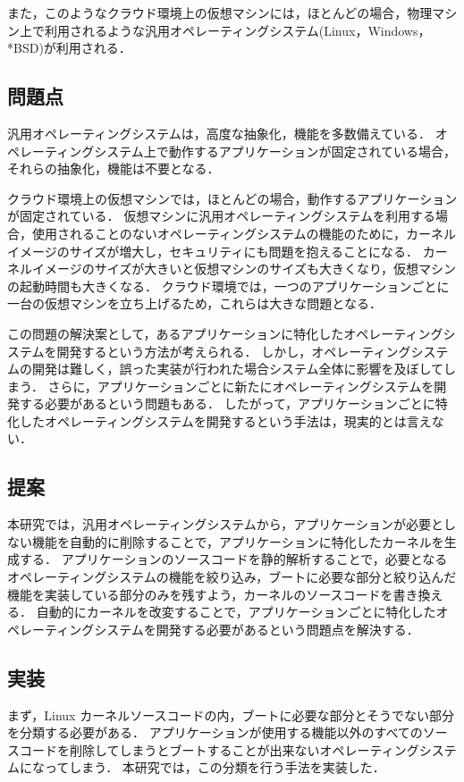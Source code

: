 \documentclass[graduation-thesis]{mlarticle}
\begin{document}
また，このようなクラウド環境上の仮想マシンには，ほとんどの場合，物理マシン上で利用されるような汎用オペレーティングシステム(Linux，Windows，*BSD)が利用される．

\subsection {問題点}
\label {intro:problem}
汎用オペレーティングシステムは，高度な抽象化，機能を多数備えている．
オペレーティングシステム上で動作するアプリケーションが固定されている場合，それらの抽象化，機能は不要となる．

クラウド環境上の仮想マシンでは，ほとんどの場合，動作するアプリケーションが固定されている．
仮想マシンに汎用オペレーティングシステムを利用する場合，使用されることのないオペレーティングシステムの機能のために，カーネルイメージのサイズが増大し，セキュリティにも問題を抱えることになる． 
カーネルイメージのサイズが大きいと仮想マシンのサイズも大きくなり，仮想マシンの起動時間も大きくなる．
クラウド環境では，一つのアプリケーションごとに一台の仮想マシンを立ち上げるため，これらは大きな問題となる．

この問題の解決案として，あるアプリケーションに特化したオペレーティングシステムを開発するという方法が考えられる．
しかし，オペレーティングシステムの開発は難しく，誤った実装が行われた場合システム全体に影響を及ぼしてしまう．
さらに，アプリケーションごとに新たにオペレーティングシステムを開発する必要があるという問題もある．
したがって，アプリケーションごとに特化したオペレーティングシステムを開発するという手法は，現実的とは言えない．


\subsection {提案}
\label{intro:proposal}
本研究では，汎用オペレーティングシステムから，アプリケーションが必要としない機能を自動的に削除することで，アプリケーションに特化したカーネルを生成する．
アプリケーションのソースコードを静的解析することで，必要となるオペレーティングシステムの機能を絞り込み，ブートに必要な部分と絞り込んだ機能を実装している部分のみを残すよう，カーネルのソースコードを書き換える．
自動的にカーネルを改変することで，アプリケーションごとに特化したオペレーティングシステムを開発する必要があるという問題点を解決する．

\subsection {実装}
\label{intro:implementation}
まず，Linux カーネルソースコードの内，ブートに必要な部分とそうでない部分を分類する必要がある．
アプリケーションが使用する機能以外のすべてのソースコードを削除してしまうとブートすることが出来ないオペレーティングシステムになってしまう．
本研究では，この分類を行う手法を実装した．
\end{document}
